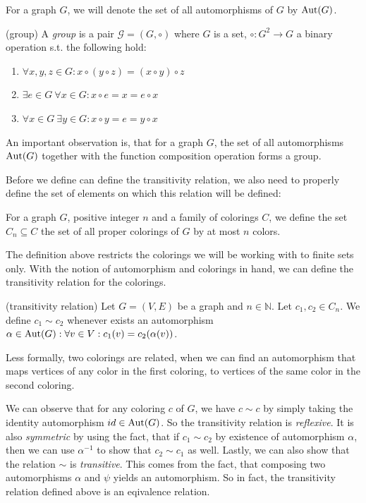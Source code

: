 For a graph $G$, we will denote the set of all automorphisms of $G$ by $\operatorname{Aut}(G)$.

\begin{defn}(group)
    A \emph{group} is a pair $\mathcal{G}=(G,\circ)$ where $G$ is a set, $\circ:G^2 \rightarrow G$ a binary operation s.t. the following hold:
    \begin{enumerate}
        \item $\forall x,y,z \in G : x \circ (y \circ z) = ( x \circ y ) \circ z$
        \item $\exists e \in G \ \forall x \in G :x \circ e = x = e \circ x$
        \item $ \forall x \in G \ \exists y \in G : x \circ y = e = y \circ x$
    \end{enumerate}
\end{defn}

An important observation is, that for a graph $G$, the set of all automorphisms $\operatorname{Aut}(G)$ together with the function composition operation forms a group. 

Before we define can define the transitivity relation, we also need to properly define the set of elements on which this relation will be defined:

\begin{defn}
    For a graph $G$, positive integer $n$ and a family of colorings $C$, we define the set $C_n \subseteq C$ the set of all proper colorings of $G$ by at most $n$ colors.
\end{defn}

The definition above restricts the colorings we will be working with to finite sets only. With the notion of automorphism and colorings in hand, we can define the transitivity relation for the colorings.

\begin{defn}(transitivity relation)
        Let $G=(V,E)$ be a graph and $n\in \mathbb{N}$. Let $c_1,c_2 \in C_n$. We define $c_1 \sim c_2$ whenever exists an automorphism $\alpha \in \operatorname{Aut}(G) : \forall v \in V : c_1(v)=c_2(\alpha(v))$.
\end{defn}

Less formally, two colorings are related, when we can find an automorphism that maps vertices of any color in the first coloring, to vertices of the same color in the second coloring. 

We can observe that for any coloring $c$ of $G$, we have $c \sim c$ by simply taking the identity automorphism $id \in \operatorname{Aut}(G)$. So the transitivity relation is \textit{reflexive}. It is also \textit{symmetric} by using the fact, that if $c_1 \sim c_2$ by existence of automorphism $\alpha$, then we can use $\alpha^{-1}$ to show that $c_2 \sim c_1$ as well. Lastly, we can also show that the relation $\sim$ is \textit{transitive}. This comes from the fact, that composing two automorphisms $\alpha$ and $\psi$ yields an automorphism. So in fact, the transitivity relation defined above is an eqivalence relation.

